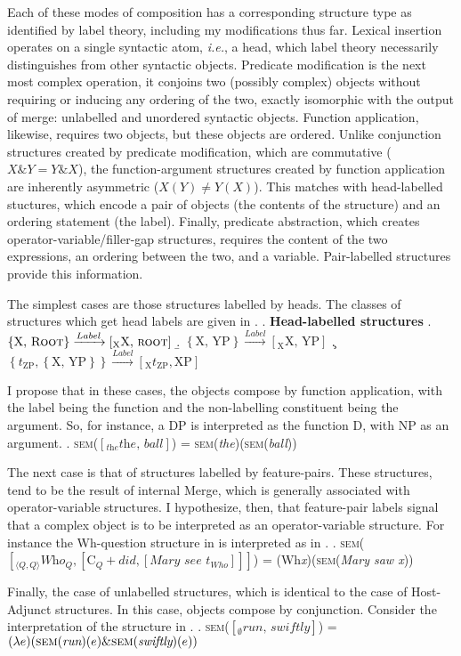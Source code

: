 \documentclass[MilwayThesis]{subfiles}
\begin{document}
Each of these modes of composition has a corresponding structure type as identified by label theory, including my modifications thus far.
Lexical insertion operates on a single syntactic atom, \textit{i.e.}, a head, which label theory necessarily distinguishes from other syntactic objects.
Predicate modification is the next most complex operation, it conjoins two (possibly complex) objects without requiring or inducing any ordering of the two, exactly isomorphic with the output of merge: unlabelled and unordered syntactic objects.
Function application, likewise, requires two objects, but these objects are ordered.
Unlike conjunction structures created by predicate modification, which are commutative ($X \& Y = Y \& X$), the function-argument structures created by function application are inherently asymmetric ($X(Y) \neq Y(X)$).
This matches with head-labelled stuctures, which encode a pair of objects (the contents of the structure) and an ordering statement (the label).
Finally, predicate abstraction, which creates operator-variable/filler-gap structures, requires the content of the two expressions, an ordering between the two, and a variable.
Pair-labelled structures provide this information.

The simplest cases are those structures labelled by heads.
The classes of structures which get head labels are given in \Next.
\ex. \textbf{Head-labelled structures}
\a. $\left\{ \text{X, }\textsc{Root} \right\} \xrightarrow{Label} \left[_\text{X} \text{X, }\textsc{root}  \right]$
\b. $\left\{ \text{X, YP} \right\} \xrightarrow{Label} \left[_\text{X} \text{X, YP} \right]$
\c. $\left\{ t_\text{ZP}, \left\{ \text{X, YP} \right\} \right\}\xrightarrow{Label}\left[_\text{X} t_\text{ZP}, \text{XP} \right]$

I propose that in these cases, the objects compose by function application, with the label being the function and the non-labelling constituent being the argument.
So, for instance, a DP is interpreted as the function D, with NP as an argument.
\ex. \textsc{sem}($\left[_\textit{the} \textit{the, ball} \right]$) = \textsc{sem}(\textit{the})(\textsc{sem}(\textit{ball}))

The next case is that of structures labelled by feature-pairs.
These structures, tend to be the result of internal Merge, which is generally associated with operator-variable structures.
I hypothesize, then, that feature-pair labels signal that a complex object is to be interpreted as an operator-variable structure.
For instance the Wh-question structure in \Next[a] is interpreted as in \Next[b].
\ex. \textsc{sem}($\left[_{\langle Q,Q \rangle} \textit{Who}_Q, \left[ \text{C}_Q+\textit{did}, \left[ \textit{Mary see } t_{Who} \right] \right]  \right]$) = (Wh\textit{x})(\textsc{sem}(\textit{Mary saw x}))

Finally, the case of unlabelled structures, which is identical to the case of Host-Adjunct structures.
In this case, objects compose by conjunction.
Consider the interpretation of the structure in \Next.
\ex. \textsc{sem}($\left[_\emptyset \textit{run, swiftly} \right]$) =  $(\lambda e)(\textsc{sem}(\textit{run})(e) \& \textsc{sem}(\textit{swiftly})(e))$
\end{document}
